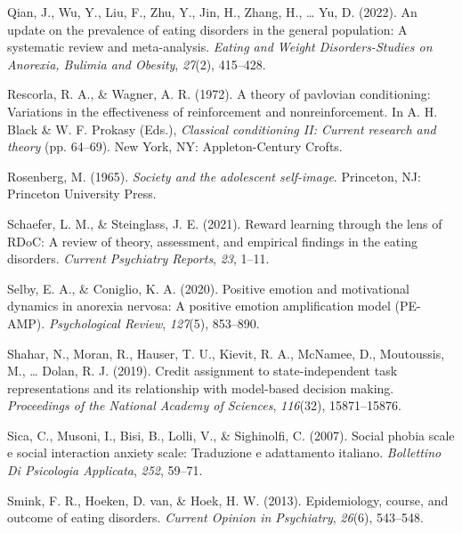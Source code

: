 \documentclass[
  man,floatsintext]{apa6}
\newlength{\cslhangindent}
\newlength{\cslentryspacingunit} %
\newenvironment{CSLReferences}[2] %
 {%
  \setlength{\parindent}{0pt}
  \ifodd #1
  \let\oldpar\par
  \def\par{\hangindent=\cslhangindent\oldpar}
  \fi
  \setlength{\parskip}{#2\cslentryspacingunit}
 }%
 {}
\begin{document}
\begin{CSLReferences}{1}{0}
\leavevmode{}%
Qian, J., Wu, Y., Liu, F., Zhu, Y., Jin, H., Zhang, H., \ldots{} Yu, D. (2022). An update on the prevalence of eating disorders in the general population: A systematic review and meta-analysis. \emph{Eating and Weight Disorders-Studies on Anorexia, Bulimia and Obesity}, \emph{27}(2), 415--428.

\leavevmode{}%
Rescorla, R. A., \& Wagner, A. R. (1972). A theory of pavlovian conditioning: Variations in the effectiveness of reinforcement and nonreinforcement. In A. H. Black \& W. F. Prokasy (Eds.), \emph{Classical conditioning II: Current research and theory} (pp. 64--69). New York, NY: Appleton-Century Crofts.

\leavevmode{}%
Rosenberg, M. (1965). \emph{Society and the adolescent self-image}. Princeton, NJ: Princeton University Press.

\leavevmode{}%
Schaefer, L. M., \& Steinglass, J. E. (2021). Reward learning through the lens of RDoC: A review of theory, assessment, and empirical findings in the eating disorders. \emph{Current Psychiatry Reports}, \emph{23}, 1--11.

\leavevmode{}%
Selby, E. A., \& Coniglio, K. A. (2020). Positive emotion and motivational dynamics in anorexia nervosa: A positive emotion amplification model (PE-AMP). \emph{Psychological Review}, \emph{127}(5), 853--890.

\leavevmode{}%
Shahar, N., Moran, R., Hauser, T. U., Kievit, R. A., McNamee, D., Moutoussis, M., \ldots{} Dolan, R. J. (2019). Credit assignment to state-independent task representations and its relationship with model-based decision making. \emph{Proceedings of the National Academy of Sciences}, \emph{116}(32), 15871--15876.

\leavevmode{}%
Sica, C., Musoni, I., Bisi, B., Lolli, V., \& Sighinolfi, C. (2007). Social phobia scale e social interaction anxiety scale: Traduzione e adattamento italiano. \emph{Bollettino Di Psicologia Applicata}, \emph{252}, 59--71.

\leavevmode{}%
Smink, F. R., Hoeken, D. van, \& Hoek, H. W. (2013). Epidemiology, course, and outcome of eating disorders. \emph{Current Opinion in Psychiatry}, \emph{26}(6), 543--548.


\end{CSLReferences}
\end{document}

